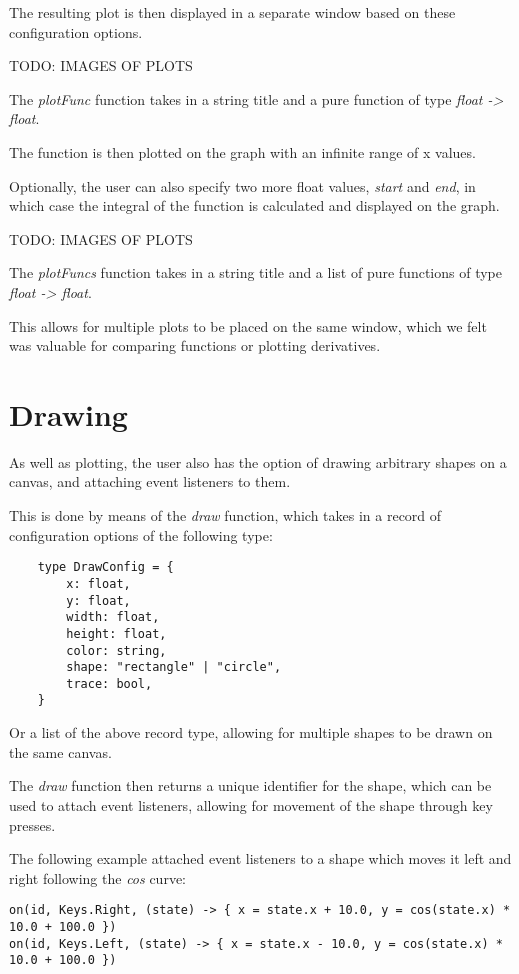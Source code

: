 The resulting plot is then displayed in a separate window based on these configuration options.

TODO: IMAGES OF PLOTS

The \textit{plotFunc} function takes in a string title and a pure function of type \textit{float -> float}.

The function is then plotted on the graph with an infinite range of x values.

Optionally, the user can also specify two more float values, \textit{start} and \textit{end}, in which case the 
integral of the function is calculated and displayed on the graph.

TODO: IMAGES OF PLOTS

The \textit{plotFuncs} function takes in a string title and a list of pure functions of type \textit{float -> float}.

This allows for multiple plots to be placed on the same window, which we felt was valuable for comparing functions 
or plotting derivatives.

\section{Drawing}\label{sec:drawing}

As well as plotting, the user also has the option of drawing arbitrary shapes on a canvas, and attaching event 
listeners to them.

This is done by means of the \textit{draw} function, which takes in a record of configuration options of the following
type:

\begin{verbatim}
    type DrawConfig = {
        x: float,
        y: float,
        width: float,
        height: float,
        color: string,
        shape: "rectangle" | "circle",
        trace: bool, 
    }
\end{verbatim}

Or a list of the above record type, allowing for multiple shapes to be drawn on the same canvas.

The \textit{draw} function then returns a unique identifier for the shape, which can be used to attach event 
listeners, allowing for movement of the shape through key presses.

The following example attached event listeners to a shape which moves it left and right following the \textit{cos} curve:

\begin{verbatim}
on(id, Keys.Right, (state) -> { x = state.x + 10.0, y = cos(state.x) * 10.0 + 100.0 })
on(id, Keys.Left, (state) -> { x = state.x - 10.0, y = cos(state.x) * 10.0 + 100.0 })
\end{verbatim}

